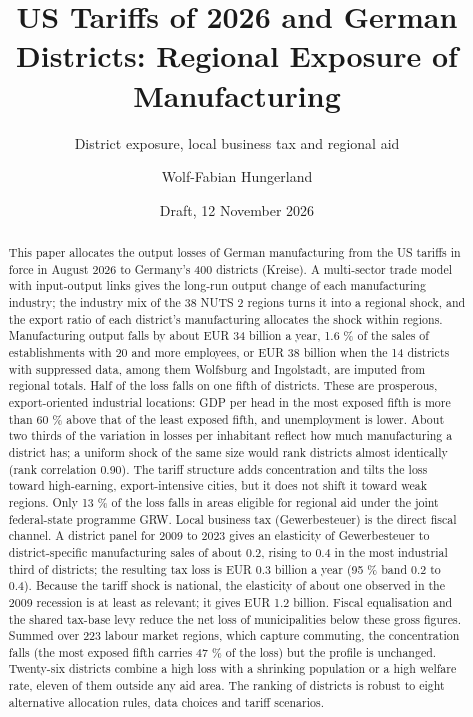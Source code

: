 \documentclass[
  11pt,
]{article}
\title{US Tariffs of 2026 and German Districts: Regional Exposure of
Manufacturing}
\subtitle{District exposure, local business tax and regional aid}
\author{Wolf-Fabian Hungerland}
\date{Draft, 12 November 2026}
\begin{document}
\maketitle
\begin{abstract}
This paper allocates the output losses of German manufacturing from the
US tariffs in force in August 2026 to Germany's 400 districts (Kreise).
A multi-sector trade model with input-output links gives the long-run
output change of each manufacturing industry; the industry mix of the 38
NUTS 2 regions turns it into a regional shock, and the export ratio of
each district's manufacturing allocates the shock within regions.
Manufacturing output falls by about EUR 34 billion a year, 1.6 \% of the
sales of establishments with 20 and more employees, or EUR 38 billion
when the 14 districts with suppressed data, among them Wolfsburg and
Ingolstadt, are imputed from regional totals. Half of the loss falls on
one fifth of districts. These are prosperous, export-oriented industrial
locations: GDP per head in the most exposed fifth is more than 60 \%
above that of the least exposed fifth, and unemployment is lower. About
two thirds of the variation in losses per inhabitant reflect how much
manufacturing a district has; a uniform shock of the same size would
rank districts almost identically (rank correlation 0.90). The tariff
structure adds concentration and tilts the loss toward high-earning,
export-intensive cities, but it does not shift it toward weak regions.
Only 13 \% of the loss falls in areas eligible for regional aid under
the joint federal-state programme GRW. Local business tax
(Gewerbesteuer) is the direct fiscal channel. A district panel for 2009
to 2023 gives an elasticity of Gewerbesteuer to district-specific
manufacturing sales of about 0.2, rising to 0.4 in the most industrial
third of districts; the resulting tax loss is EUR 0.3 billion a year (95
\% band 0.2 to 0.4). Because the tariff shock is national, the
elasticity of about one observed in the 2009 recession is at least as
relevant; it gives EUR 1.2 billion. Fiscal equalisation and the shared
tax-base levy reduce the net loss of municipalities below these gross
figures. Summed over 223 labour market regions, which capture commuting,
the concentration falls (the most exposed fifth carries 47 \% of the
loss) but the profile is unchanged. Twenty-six districts combine a high
loss with a shrinking population or a high welfare rate, eleven of them
outside any aid area. The ranking of districts is robust to eight
alternative allocation rules, data choices and tariff scenarios.
\end{abstract}
\end{document}
